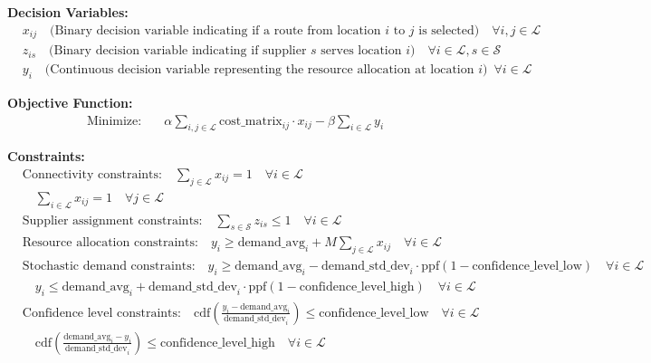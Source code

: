 \documentclass[preprint,review, 11pt,3p,authoryear]{elsarticle}
\begin{document}
\textbf{Decision Variables:}
\begin{align*}
& x_{ij} \quad \text{(Binary decision variable indicating if a route from location $i$ to $j$ is selected)} \quad \forall i, j \in \mathcal{L} \\
& z_{is} \quad \text{(Binary decision variable indicating if supplier $s$ serves location $i$)} \quad \forall i \in \mathcal{L}, s \in \mathcal{S} \\
& y_i \quad \text{(Continuous decision variable representing the resource allocation at location $i$)} \quad \forall i \in \mathcal{L}
\end{align*}

\textbf{Objective Function:}
\begin{align*}
\text{Minimize:} \quad & \alpha \sum_{i,j \in \mathcal{L}} \text{cost\_matrix}_{ij} \cdot x_{ij} - \beta \sum_{i \in \mathcal{L}} y_i
\end{align*}

\textbf{Constraints:}
\begin{align*}
& \text{Connectivity constraints:} \quad \sum_{j \in \mathcal{L}} x_{ij} = 1 \quad \forall i \in \mathcal{L} \\
& \quad \sum_{i \in \mathcal{L}} x_{ij} = 1 \quad \forall j \in \mathcal{L} \\
& \text{Supplier assignment constraints:} \quad \sum_{s \in \mathcal{S}} z_{is} \leq 1 \quad \forall i \in \mathcal{L} \\
& \text{Resource allocation constraints:} \quad y_i \geq \text{demand\_avg}_i + M \sum_{j \in \mathcal{L}} x_{ij} \quad \forall i \in \mathcal{L} \\
& \text{Stochastic demand constraints:} \quad y_i \geq \text{demand\_avg}_i - \text{demand\_std\_dev}_i \cdot \text{ppf}(1 - \text{confidence\_level\_low}) \quad \forall i \in \mathcal{L} \\
& \quad y_i \leq \text{demand\_avg}_i + \text{demand\_std\_dev}_i \cdot \text{ppf}(1 - \text{confidence\_level\_high}) \quad \forall i \in \mathcal{L} \\
& \text{Confidence level constraints:} \quad \text{cdf}\left(\frac{y_i - \text{demand\_avg}_i}{\text{demand\_std\_dev}_i}\right) \leq \text{confidence\_level\_low} \quad \forall i \in \mathcal{L} \\
& \quad \text{cdf}\left(\frac{\text{demand\_avg}_i - y_i}{\text{demand\_std\_dev}_i}\right) \leq \text{confidence\_level\_high} \quad \forall i \in \mathcal{L}
\end{align*}
\end{document}
